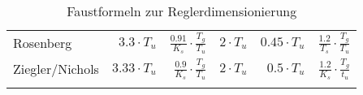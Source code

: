 \begin{longtable}{p{50mm}rrrrr}
    \addlinespace[1em]

    Rosenberg \cite{ref:op_ros_zieg}
    &
    $3.3 \cdot T_u $
    &
    $ \frac{0.91}{K_s} \cdot \frac{T_g}{T_u} $
    &
    $ 2 \cdot T_u $
    &
    $ 0.45 \cdot T_u $
    &
    $ \frac{1.2}{T_s} \cdot \frac{T_g}{T_u}$
    \\

    \addlinespace[1em]

    Ziegler/Nichols \cite{ref:op_ros_zieg}
    &
    $ 3.33 \cdot T_u $
    &
    $ \frac{0.9}{K_s} \cdot \frac{T_g}{T_u} $
    &
    $ 2 \cdot T_u $
    &
    $ 0.5 \cdot T_u $
    &
    $ \frac{1.2}{K_s} \cdot \frac{T_g}{t_u} $
    \\

    \bottomrule
\caption{Faustformeln zur Reglerdimensionierung}
\label{tab:faustformeln}
\end{longtable}
